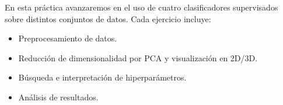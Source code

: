 En esta práctica avanzaremos en el uso de cuatro clasificadores supervisados
sobre distintos conjuntos de datos. Cada ejercicio incluye:

\begin{itemize}
    \item Preprocesamiento de datos.
    \item Reducción de dimensionalidad por PCA y visualización en 2D/3D.
    \item Búsqueda e interpretación de hiperparámetros.
    \item Análisis de resultados.
\end{itemize}
